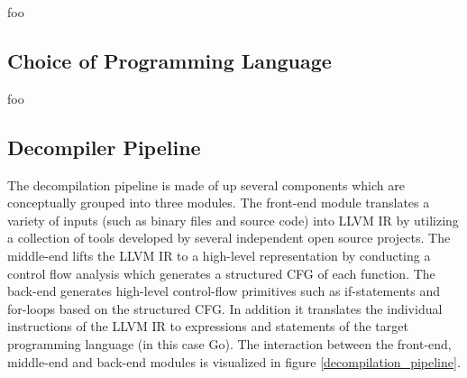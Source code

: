 \documentclass[12pt, a4paper]{article}
\begin{document}

foo


\subsection{Choice of Programming Language}

foo



\subsection{Decompiler Pipeline}



The decompilation pipeline is made of up several components which are conceptually grouped into three modules. The front-end module translates a variety of inputs (such as binary files and source code) into LLVM IR by utilizing a collection of tools developed by several independent open source projects. The middle-end lifts the LLVM IR to a high-level representation by conducting a control flow analysis which generates a structured CFG of each function. The back-end generates high-level control-flow primitives such as if-statements and for-loops based on the structured CFG. In addition it translates the individual instructions of the LLVM IR to expressions and statements of the target programming language (in this case Go). The interaction between the front-end, middle-end and back-end modules is visualized in figure \ref{decompilation_pipeline}.
\end{document}
